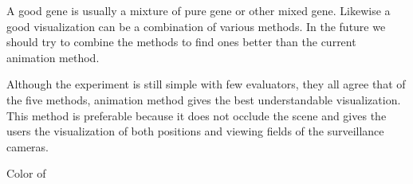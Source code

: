 A good gene is usually a mixture of pure gene or other mixed gene. Likewise a good visualization can be a combination of various methods. In the future we should try to combine the methods to find ones better than the current animation method.

Although the experiment is still simple with few evaluators, they all agree that of the five methods, animation method gives the best understandable visualization. This method is preferable because it does not occlude the scene and gives the users the visualization of both positions and viewing fields of the surveillance cameras.

Color of
